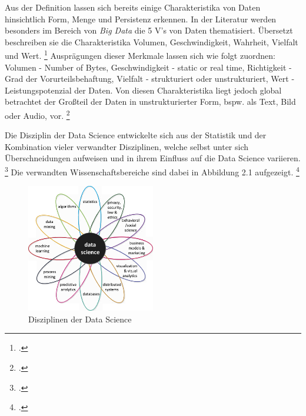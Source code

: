 Aus der Definition lassen sich bereits einige Charakteristika von Daten hinsichtlich Form, Menge und Persistenz erkennen.
In der Literatur werden besonders im Bereich von \textit{Big Data} die 5 V's von Daten thematisiert.
Übersetzt beschreiben sie die Charakteristika Volumen, Geschwindigkeit, Wahrheit, Vielfalt und Wert. \footcite[prenote][postnote]{Big data is always}
Ausprägungen dieser Merkmale lassen sich wie folgt zuordnen: Volumen - Number of Bytes, Geschwindigkeit - static or real time, Richtigkeit - Grad der Vorurteilsbehaftung, Vielfalt - strukturiert oder unstrukturiert, Wert - Leistungspotenzial der Daten.
Von diesen Charakteristika liegt jedoch global betrachtet der Großteil der Daten in unstrukturierter Form, bspw. als Text, Bild oder Audio, vor. \footcite[prenote][postnote]{most of the data}

Die Disziplin der Data Science entwickelte sich aus der Statistik und der Kombination vieler verwandter Disziplinen, welche selbst unter sich Überschneidungen aufweisen und in ihrem Einfluss auf die Data Science variieren. \footcite[prenote][postnote]{disciplines of data science}
Die verwandten Wissenschaftsbereiche sind dabei in Abbildung 2.1 aufgezeigt. \footcite[prenote][postnote]{disciplines of data science}

\begin{figure}[htb]
    \centering
    \includegraphics[width=0.5\textwidth]{graphics/ds_disciplines.png}
    \caption{Disziplinen der Data Science}
    \label{fig:data science disciplines}
\end{figure}

